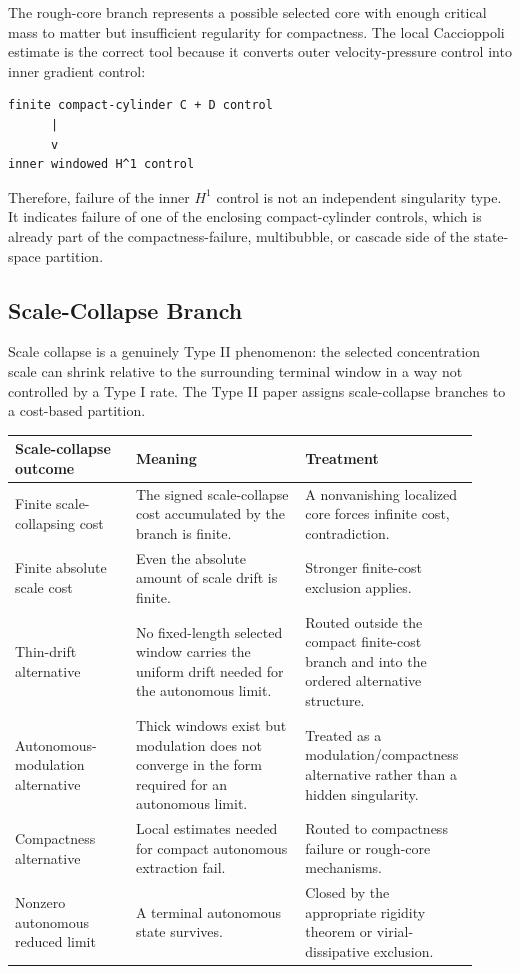 \documentclass[11pt]{amsart}
\begin{document}
The rough-core branch represents a possible selected core with enough critical mass to matter but insufficient regularity for compactness.  The local Caccioppoli estimate is the correct tool because it converts outer velocity-pressure control into inner gradient control:

\begin{center}
\begin{minipage}{0.92\linewidth}
\scriptsize
\begin{verbatim}
finite compact-cylinder C + D control
      |
      v
inner windowed H^1 control
\end{verbatim}
\end{minipage}
\end{center}

Therefore, failure of the inner \(H^1\) control is not an independent singularity type.  It indicates failure of one of the enclosing compact-cylinder controls, which is already part of the compactness-failure, multibubble, or cascade side of the state-space partition.

\subsection{Scale-Collapse Branch}

Scale collapse is a genuinely Type II phenomenon: the selected concentration scale can shrink relative to the surrounding terminal window in a way not controlled by a Type I rate.  The Type II paper assigns scale-collapse branches to a cost-based partition.

\begin{longtable}{@{}>{\raggedright\arraybackslash}p{0.25\linewidth}>{\raggedright\arraybackslash}p{0.35\linewidth}>{\raggedright\arraybackslash}p{0.32\linewidth}@{}}
\toprule
\textbf{Scale-collapse outcome} & \textbf{Meaning} & \textbf{Treatment} \\
\midrule
\endhead
Finite scale-collapsing cost & The signed scale-collapse cost accumulated by the branch is finite. & A nonvanishing localized core forces infinite cost, contradiction. \\
Finite absolute scale cost & Even the absolute amount of scale drift is finite. & Stronger finite-cost exclusion applies. \\
Thin-drift alternative & No fixed-length selected window carries the uniform drift needed for the autonomous limit. & Routed outside the compact finite-cost branch and into the ordered alternative structure. \\
Autonomous-modulation alternative & Thick windows exist but modulation does not converge in the form required for an autonomous limit. & Treated as a modulation/compactness alternative rather than a hidden singularity. \\
Compactness alternative & Local estimates needed for compact autonomous extraction fail. & Routed to compactness failure or rough-core mechanisms. \\
Nonzero autonomous reduced limit & A terminal autonomous state survives. & Closed by the appropriate rigidity theorem or virial-dissipative exclusion. \\
\bottomrule
\end{longtable}
\end{document}
